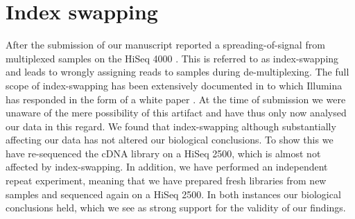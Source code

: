 \documentclass{article}
\begin{document}


\section*{Index swapping}
After the submission of our manuscript \citeauthor{Sinha2017} reported a spreading-of-signal from multiplexed samples on the HiSeq 4000 \autocite{Sinha2017}.
This is referred to as index-swapping and leads to wrongly assigning reads to samples during de-multiplexing.
The full scope of index-swapping has been extensively documented in \autocite{Sinha2017} to which Illumina has responded in the form of a white paper \autocite{Illumina}.
At the time of submission we were unaware of the mere possibility of this artifact and have thus only now analysed our data in this regard.
We found that index-swapping although substantially affecting our data has not altered our biological conclusions.
To show this we have re-sequenced the cDNA library on a HiSeq 2500, which is almost not affected by index-swapping.
In addition, we have performed an independent repeat experiment, meaning that we have prepared fresh libraries from new samples and sequenced again on a HiSeq 2500.
In both instances our biological conclusions held, which we see as strong support for the validity of our findings.

\end{document}
